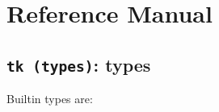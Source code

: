\chapter{Reference Manual}
\label{chap:ref}





\section{{\tt tk (types)}: types}
Builtin types are:





